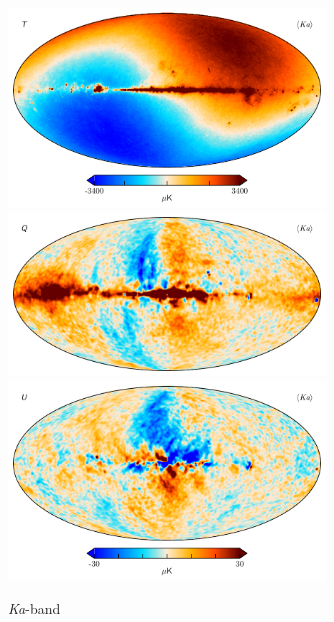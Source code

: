 \documentclass[twocolumn]{../../common/aa}
\newcommand{\Ka}[0]{\textit{Ka}}
\begin{document}
\begin{figure}
	\centering
	\includegraphics[width=0.75\textwidth]{figures/030-WMAP_Ka_mu_I.pdf}
	\includegraphics[width=0.75\textwidth]{figures/030-WMAP_Ka_mu_Q.pdf}
	\includegraphics[width=0.75\textwidth]{figures/030-WMAP_Ka_mu_U.pdf}
	\caption{\Ka-band}
\end{figure}
\end{document}
